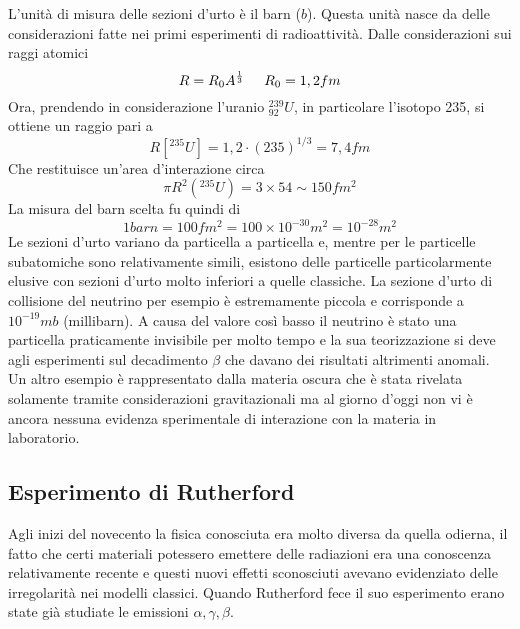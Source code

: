 L'unità di misura delle sezioni d'urto è il barn ($b$). 
Questa unità nasce da delle considerazioni fatte nei primi esperimenti di radioattività.
Dalle considerazioni sui raggi atomici 
\begin{equation}
R=R_0A^{\frac{1}{3}}\hspace{0.5cm} R_0=1,2fm
\end{equation}
Ora, prendendo in considerazione l'uranio $^{239}_{92}U$, in particolare l'isotopo 235, si ottiene un raggio pari a 
\begin{equation}
R[^{235}U]=1,2\cdot (235)^{1/3}=7,4fm
\end{equation}
Che restituisce un'area d'interazione circa
\begin{equation}
\pi R^2(^{235}U)=3\times54\sim 150fm^2
\end{equation}
La misura del barn scelta fu quindi di
\begin{equation}
1barn=100fm^2=100\times 10^{-30}m^2=10^{-28}m^2
\end{equation}
Le sezioni d'urto variano da particella a particella e, mentre per le particelle subatomiche sono relativamente simili, esistono delle particelle particolarmente elusive con sezioni d'urto molto inferiori a quelle classiche.
La sezione d'urto di collisione del neutrino per esempio è estremamente piccola e corrisponde a $10^{-19}mb$ (millibarn).
A causa del valore così basso il neutrino è stato una particella praticamente invisibile per molto tempo e la sua teorizzazione si deve agli esperimenti sul decadimento $\beta$ che davano dei risultati altrimenti anomali.
Un altro esempio è rappresentato dalla materia oscura che è stata rivelata solamente tramite considerazioni gravitazionali ma al giorno d'oggi non vi è ancora nessuna evidenza sperimentale di interazione con la materia in laboratorio.


\subsection{Esperimento di Rutherford}
Agli inizi del novecento la fisica conosciuta era molto diversa da quella odierna, il fatto che certi materiali potessero emettere delle radiazioni era una conoscenza relativamente recente e questi nuovi effetti sconosciuti avevano evidenziato delle irregolarità nei modelli classici.  
Quando Rutherford fece il suo esperimento erano state già studiate le emissioni $\alpha,\gamma ,\beta$.


